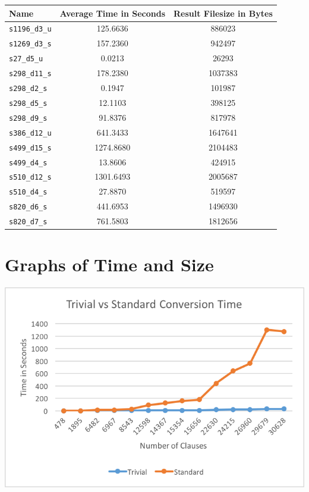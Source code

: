 \begin{center}
\begin{tabular}{| l | c | c |}
\hline
\textbf{Name} & \textbf{Average Time in Seconds} & \textbf{Result Filesize in Bytes} \\ \hline
\texttt{s1196\_d3\_u} & 125.6636 & 886023 \\
\texttt{s1269\_d3\_s} & 157.2360 & 942497 \\
\texttt{s27\_d5\_u} & 0.0213 & 26293 \\
\texttt{s298\_d11\_s} & 178.2380 & 1037383 \\
\texttt{s298\_d2\_s} & 0.1947 & 101987 \\
\texttt{s298\_d5\_s} & 12.1103 & 398125 \\
\texttt{s298\_d9\_s} & 91.8376 & 817978 \\
\texttt{s386\_d12\_u} & 641.3433 & 1647641 \\
\texttt{s499\_d15\_s} & 1274.8680 & 2104483 \\
\texttt{s499\_d4\_s} & 13.8606 & 424915 \\
\texttt{s510\_d12\_s} & 1301.6493 & 2005687 \\
\texttt{s510\_d4\_s} & 27.8870 & 519597 \\
\texttt{s820\_d6\_s} & 441.6953 & 1496930 \\
\texttt{s820\_d7\_s} & 761.5803 & 1812656 \\
\hline
\end{tabular}
\end{center}

\section{Graphs of Time and Size}

\begin{center}
\includegraphics{trivialvsstandardconversiontime.png}
\end{center}


